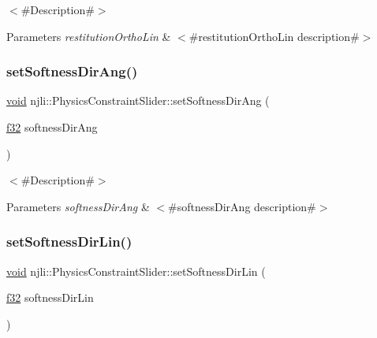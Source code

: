 $<$\#\+Description\#$>$


\begin{DoxyParams}{Parameters}
{\em restitution\+Ortho\+Lin} & $<$\#restitution\+Ortho\+Lin description\#$>$ \\
\hline
\end{DoxyParams}
\mbox{\label{classnjli_1_1_physics_constraint_slider_a38119f35a3296c2cb3d296b216d9fad5}} 
\subsubsection{\texorpdfstring{set\+Softness\+Dir\+Ang()}{setSoftnessDirAng()}}
{\footnotesize\ttfamily \mbox{\hyperlink{_thread_8h_af1e856da2e658414cb2456cb6f7ebc66}{void}} njli\+::\+Physics\+Constraint\+Slider\+::set\+Softness\+Dir\+Ang (\begin{DoxyParamCaption}\item[{\mbox{\hyperlink{_util_8h_a5f6906312a689f27d70e9d086649d3fd}{f32}}}]{softness\+Dir\+Ang }\end{DoxyParamCaption})}

$<$\#\+Description\#$>$


\begin{DoxyParams}{Parameters}
{\em softness\+Dir\+Ang} & $<$\#softness\+Dir\+Ang description\#$>$ \\
\hline
\end{DoxyParams}
\mbox{\label{classnjli_1_1_physics_constraint_slider_a3aba80e223b149a32c93de1ecbdc7fba}} 
\subsubsection{\texorpdfstring{set\+Softness\+Dir\+Lin()}{setSoftnessDirLin()}}
{\footnotesize\ttfamily \mbox{\hyperlink{_thread_8h_af1e856da2e658414cb2456cb6f7ebc66}{void}} njli\+::\+Physics\+Constraint\+Slider\+::set\+Softness\+Dir\+Lin (\begin{DoxyParamCaption}\item[{\mbox{\hyperlink{_util_8h_a5f6906312a689f27d70e9d086649d3fd}{f32}}}]{softness\+Dir\+Lin }\end{DoxyParamCaption})}

